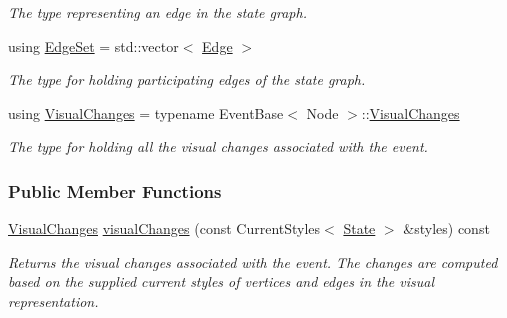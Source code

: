 \begin{DoxyCompactItemize}
\begin{DoxyCompactList}\small\item\em The type representing an edge in the state graph. \end{DoxyCompactList}\item 
using \hyperlink{structslb_1_1ext_1_1event_1_1UniformChange_af17825d303d567061f2d510f231d556c}{Edge\+Set} = std\+::vector$<$ \hyperlink{structslb_1_1ext_1_1event_1_1UniformChange_a7ea26ff1c10c84d9bd6002bf5f175f22}{Edge} $>$\hypertarget{structslb_1_1ext_1_1event_1_1UniformChange_af17825d303d567061f2d510f231d556c}{}\label{structslb_1_1ext_1_1event_1_1UniformChange_af17825d303d567061f2d510f231d556c}

\begin{DoxyCompactList}\small\item\em The type for holding participating edges of the state graph. \end{DoxyCompactList}\item 
using \hyperlink{structslb_1_1ext_1_1event_1_1UniformChange_a50451c9eab14e2bc320444db5ac9c928}{Visual\+Changes} = typename Event\+Base$<$ Node $>$\+::\hyperlink{structslb_1_1ext_1_1event_1_1UniformChange_a50451c9eab14e2bc320444db5ac9c928}{Visual\+Changes}\hypertarget{structslb_1_1ext_1_1event_1_1UniformChange_a50451c9eab14e2bc320444db5ac9c928}{}\label{structslb_1_1ext_1_1event_1_1UniformChange_a50451c9eab14e2bc320444db5ac9c928}

\begin{DoxyCompactList}\small\item\em The type for holding all the visual changes associated with the event. \end{DoxyCompactList}\end{DoxyCompactItemize}
\subsubsection*{Public Member Functions}
\begin{DoxyCompactItemize}
\item 
\hyperlink{structslb_1_1ext_1_1event_1_1UniformChange_a50451c9eab14e2bc320444db5ac9c928}{Visual\+Changes} \hyperlink{structslb_1_1ext_1_1event_1_1UniformChange_a06773390cd4c35bc3486d0c0ea2d3684}{visual\+Changes} (const Current\+Styles$<$ \hyperlink{structslb_1_1ext_1_1event_1_1UniformChange_ab06eed9d60ebe5b1a067319a52906351}{State} $>$ \&styles) const 
\begin{DoxyCompactList}\small\item\em Returns the visual changes associated with the event. The changes are computed based on the supplied current styles of vertices and edges in the visual representation. \end{DoxyCompactList}\end{DoxyCompactItemize}
